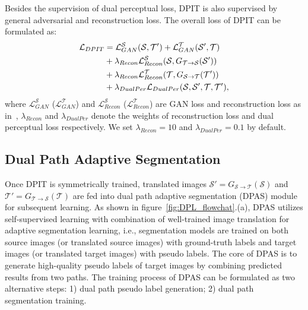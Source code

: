 \documentclass[10pt,twocolumn,letterpaper]{article}
\begin{document}
Besides the supervision of dual perceptual loss, DPIT is also supervised by general adversarial and reconstruction loss. The overall loss of DPIT can be formulated as:
\begin{equation}
\label{loss:dualGAN}
\begin{aligned}
\mathcal{L}_{DPIT}&=  \mathcal{L}^{\mathcal{S}}_{GAN}(\mathcal{S},\mathcal{T}') + \mathcal{L}^{\mathcal{T}}_{GAN}( \mathcal{S}',\mathcal{T})\\
 &+\lambda_{Recon}\mathcal{L}^{\mathcal{S}}_{Recon}(\mathcal{S}, G_{\mathcal{T}\rightarrow\mathcal{S}}(\mathcal{S}'))\\
 &+\lambda_{Recon}\mathcal{L}_{Recon}^{\mathcal{T}}(\mathcal{T}, G_{\mathcal{S}\rightarrow\mathcal{T}}(\mathcal{T}'))\\
 &+{\lambda}_{DualPer} \mathcal{L}_{DualPer}(\mathcal{S}, \mathcal{S}', \mathcal{T}, \mathcal{T}'),
 \end{aligned}
 \vspace{-0.1cm}
\end{equation}
where $\mathcal{L}^{\mathcal{S}}_{GAN}$ ($\mathcal{L}^{\mathcal{T}}_{GAN}$) and $\mathcal{L}^{\mathcal{S}}_{Recon}$ ($\mathcal{L}^{\mathcal{T}}_{Recon}$) are GAN loss and reconstruction loss as in~\cite{CycleGAN2017}, $\lambda_{Recon}$ and ${\lambda}_{DualPer}$ denote the weights of reconstruction loss and dual perceptual loss respectively. We set $\lambda_{Recon}=10$ and $\lambda_{DualPer}=0.1$ by default.


\subsection{Dual Path Adaptive Segmentation \label{section:DPSA}} 

 Once DPIT is symmetrically trained, translated images $\mathcal{S}'= {G_{\mathcal{S}\rightarrow\mathcal{T}}}(\mathcal{S})$ and $\mathcal{T}'= {G_{\mathcal{T}\rightarrow\mathcal{S}}}(\mathcal{T})$ are fed into dual path adaptive segmentation (DPAS) module for subsequent learning. As shown in figure~\ref{fig:DPL_flowchat}.(a), DPAS utilizes self-supervised learning with combination of well-trained image translation for adaptive segmentation learning, i.e., segmentation models are trained on both source images (or translated source images) with ground-truth labels and target images (or translated target images) with pseudo labels. The core of DPAS is to generate high-quality pseudo labels of target images by combining predicted results from two paths. The training process of DPAS can be formulated as two alternative steps: 1) dual path pseudo label generation; 2) dual path segmentation training.
\end{document}
